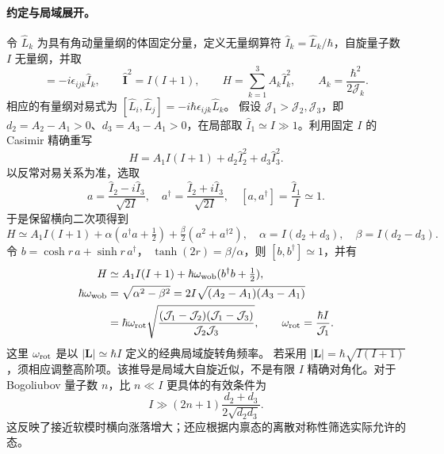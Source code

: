 \paragraph{约定与局域展开。}
令 $\hat L_k$ 为具有角动量量纲的体固定分量，定义无量纲算符
$\hat I_k=\hat L_k/\hbar$，自旋量子数 $I$ 无量纲，并取
\begin{equation}
 [\hat I_i,\hat I_j]=-i\epsilon_{ijk}\hat I_k,\qquad
 \hat{\boldsymbol I}^{2}=I(I+1),\qquad
 H=\sum_{k=1}^3 A_k\hat I_k^2,\qquad
 A_k=\frac{\hbar^2}{2\mathcal J_k}.
\end{equation}
相应的有量纲对易式为 $[\hat L_i,\hat L_j]=-i\hbar\epsilon_{ijk}\hat L_k$。
假设 $\mathcal J_1>\mathcal J_2,\mathcal J_3$，即
$d_2=A_2-A_1>0$、$d_3=A_3-A_1>0$，在局部取
$\hat I_1\simeq I\gg1$。利用固定 $I$ 的 Casimir 精确重写
\begin{equation}
 H=A_1I(I+1)+d_2\hat I_2^2+d_3\hat I_3^2.
\end{equation}
以反常对易关系为准，选取
\begin{equation}
 a=\frac{\hat I_2-i\hat I_3}{\sqrt{2I}},\quad
 a^\dagger=\frac{\hat I_2+i\hat I_3}{\sqrt{2I}},\quad
 [a,a^\dagger]=\frac{\hat I_1}{I}\simeq1.
\end{equation}
于是保留横向二次项得到
\begin{equation}
 H\simeq A_1I(I+1)+\alpha\left(a^\dagger a+\tfrac12\right)
 +\tfrac{\beta}{2}(a^2+a^{\dagger2}),\quad
 \alpha=I(d_2+d_3),\quad\beta=I(d_2-d_3).
\end{equation}
令 $b=\cosh r\,a+\sinh r\,a^\dagger$，
$\tanh(2r)=\beta/\alpha$，则 $[b,b^\dagger]\simeq1$，并有
\begin{align}
 H&\simeq A_1I(I+1)+\hbar\omega_{\rm wob}
 (b^\dagger b+\tfrac12),\\
 \hbar\omega_{\rm wob}&=\sqrt{\alpha^2-\beta^2}
 =2I\sqrt{(A_2-A_1)(A_3-A_1)}\\
 &=\hbar\omega_{\rm rot}
 \sqrt{\frac{(\mathcal J_1-\mathcal J_2)(\mathcal J_1-\mathcal J_3)}
 {\mathcal J_2\mathcal J_3}},\qquad
 \omega_{\rm rot}=\frac{\hbar I}{\mathcal J_1}.
\end{align}
这里 $\omega_{\rm rot}$ 是以 $|\boldsymbol L|\simeq\hbar I$ 定义的经典局域旋转角频率。
若采用 $|\boldsymbol L|=\hbar\sqrt{I(I+1)}$，须相应调整高阶项。该推导是局域大自旋近似，不是有限 $I$ 精确对角化。对于 Bogoliubov 量子数 $n$，比 $n\ll I$ 更具体的有效条件为
\begin{equation}
 I\gg(2n+1)\frac{d_2+d_3}{2\sqrt{d_2d_3}}.
\end{equation}
这反映了接近软模时横向涨落增大；还应根据内禀态的离散对称性筛选实际允许的态。

